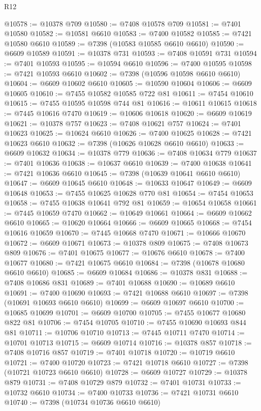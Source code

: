 \begin{lexlean}{R12}
\begin{coremodule}
{{{{{{{{{{{{{{{{{{{{{{{{{{{{{{{{{{{{{{{{{{{{{{{{{{{{{{{{{{{{{{{{{{{{{{{{{{{{{{{{{{@10578 := @10378 @709
@10580 := @7408 @10578 @709
@10581 := @7401 @10580
@10582 := @10581 @6610
@10583 := @7400 @10582
@10585 := @7421 @10580 @6610
@10589 := @7398 (@10583 @10585 @6610 @6610)
@10590 := @6609 @10589
@10591 := @10378 @731
@10593 := @7408 @10591 @731
@10594 := @7401 @10593
@10595 := @10594 @6610
@10596 := @7400 @10595
@10598 := @7421 @10593 @6610
@10602 := @7398 (@10596 @10598 @6610 @6610)
@10604 := @6609 @10602 @6610
@10605 := @10590 @10604
@10606 := @6609 @10605
@10610 := @7455 @10582 @10585 @722 @81
@10611 := @7454 @10610
@10615 := @7455 @10595 @10598 @744 @81
@10616 := @10611 @10615
@10618 := @7445 @10616 @7470
@10619 := @10606 @10618
@10620 := @6609 @10619
@10621 := @10378 @757
@10623 := @7408 @10621 @757
@10624 := @7401 @10623
@10625 := @10624 @6610
@10626 := @7400 @10625
@10628 := @7421 @10623 @6610
@10632 := @7398 (@10626 @10628 @6610 @6610)
@10633 := @6609 @10632
@10634 := @10378 @779
@10636 := @7408 @10634 @779
@10637 := @7401 @10636
@10638 := @10637 @6610
@10639 := @7400 @10638
@10641 := @7421 @10636 @6610
@10645 := @7398 (@10639 @10641 @6610 @6610)
@10647 := @6609 @10645 @6610
@10648 := @10633 @10647
@10649 := @6609 @10648
@10653 := @7455 @10625 @10628 @770 @81
@10654 := @7454 @10653
@10658 := @7455 @10638 @10641 @792 @81
@10659 := @10654 @10658
@10661 := @7445 @10659 @7470
@10662 := @10649 @10661
@10664 := @6609 @10662 @6610
@10665 := @10620 @10664
@10666 := @6609 @10665
@10668 := @7454 @10616 @10659
@10670 := @7445 @10668 @7470
@10671 := @10666 @10670
@10672 := @6609 @10671
@10673 := @10378 @809
@10675 := @7408 @10673 @809
@10676 := @7401 @10675
@10677 := @10676 @6610
@10678 := @7400 @10677
@10680 := @7421 @10675 @6610
@10684 := @7398 (@10678 @10680 @6610 @6610)
@10685 := @6609 @10684
@10686 := @10378 @831
@10688 := @7408 @10686 @831
@10689 := @7401 @10688
@10690 := @10689 @6610
@10691 := @7400 @10690
@10693 := @7421 @10688 @6610
@10697 := @7398 (@10691 @10693 @6610 @6610)
@10699 := @6609 @10697 @6610
@10700 := @10685 @10699
@10701 := @6609 @10700
@10705 := @7455 @10677 @10680 @822 @81
@10706 := @7454 @10705
@10710 := @7455 @10690 @10693 @844 @81
@10711 := @10706 @10710
@10713 := @7445 @10711 @7470
@10714 := @10701 @10713
@10715 := @6609 @10714
@10716 := @10378 @857
@10718 := @7408 @10716 @857
@10719 := @7401 @10718
@10720 := @10719 @6610
@10721 := @7400 @10720
@10723 := @7421 @10718 @6610
@10727 := @7398 (@10721 @10723 @6610 @6610)
@10728 := @6609 @10727
@10729 := @10378 @879
@10731 := @7408 @10729 @879
@10732 := @7401 @10731
@10733 := @10732 @6610
@10734 := @7400 @10733
@10736 := @7421 @10731 @6610
@10740 := @7398 (@10734 @10736 @6610 @6610)
}}}}}}}}}}}}}}}}}}}}}}}}}}}}}}}}}}}}}}}}}}}}}}}}}}}}}}}}}}}}}}}}}}}}}}}}}}}}}}}}}}
\end{coremodule}
\end{lexlean}
